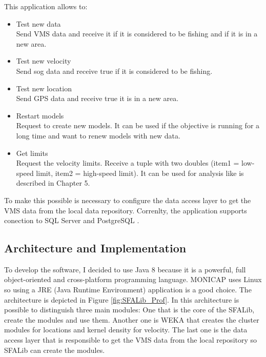 This application allows to:
\begin{itemize}
\item Test new data \\ Send VMS data and receive it if it is considered to be fishing and if it is in a new area.
\item Test new velocity \\ Send sog data and receive true if it is considered to be fishing.
\item Test new location \\ Send GPS data and receive true it is in a new area.
\item Restart models \\ Request to create new models. It can be used if the objective is running for a long time and want to renew models with new data. 
\item Get limits \\ Request the velocity limits. Receive a tuple with two doubles (item1 = low-speed limit, item2 = high-speed limit). It can be used for analysis like is described in Chapter 5.
\end{itemize}

To make this possible is necessary to configure the data access layer to get the VMS data from the local data repository.
Correnlty, the application supports conection to SQL Server \cite{WEBSITE:SqlServer} and PostgreSQL \cite{WEBSITE:Postgresql}.




\subsection{Architecture and Implementation} %
\label{sub:architecturee_implementation}
To develop the software, I decided to use Java 8 \cite{WEBSITE:OraJava8} because it is a powerful, full object-oriented and cross-platform programming language. MONICAP uses Linux so using a JRE (Java Runtime Environment) application is a good choice.
The architecture is depicted in Figure \ref{fig:SFALib_Prof}. In this architecture is possible to distinguish three main modules: One that is the core of the SFALib, create the modules and use them. Another one is WEKA \cite{WEBSITE:Weka} that creates the cluster modules for locations and kernel density for velocity. The last one is the data access layer that is responsible to get the VMS data from the local repository so SFALib can create the modules.


